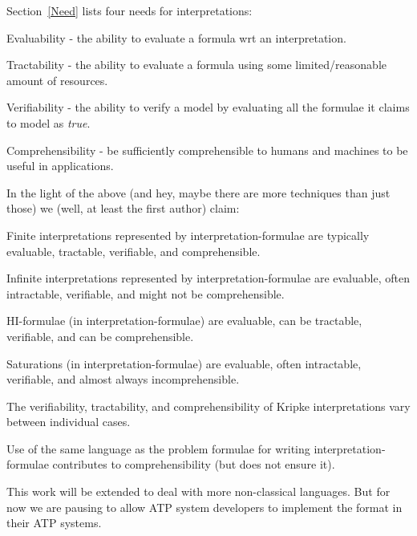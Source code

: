 \documentclass{easychair}
\newenvironment{packed_itemize}{
\vspace*{-0.3em}
\begin{itemize}
\setlength{\partopsep}{0pt}
\setlength{\itemsep}{1pt}
\setlength{\parskip}{0pt}
\setlength{\parsep}{0pt}
}{\end{itemize}}
\newenvironment{packed_enumerate}{
\vspace*{-0.3em}
\begin{enumerate}
\setlength{\partopsep}{0pt}
\setlength{\itemsep}{1pt}
\setlength{\parskip}{0pt}
\setlength{\parsep}{0pt}
}{\end{enumerate}}
\begin{document}
Section~\ref{Need} lists four needs for interpretations: 
\begin{packed_enumerate}
\item Evaluability - the ability to evaluate a formula wrt an interpretation.
\item Tractability - the ability to evaluate a formula using some limited/reasonable amount of
      resources.
\item Verifiability - the ability to verify a model by evaluating all the formulae it claims
      to model as \textit{true}.
\item Comprehensibility - be sufficiently comprehensible to humans and machines to be useful in 
      applications.
\end{packed_enumerate}

In the light of the above (and hey, maybe there are more techniques than just those) we (well,
at least the first author) claim:
\begin{packed_itemize}
\item Finite interpretations represented by interpretation-formulae are typically evaluable,
      tractable, verifiable, and comprehensible.
\item Infinite interpretations represented by interpretation-formulae are evaluable, often 
      intractable, verifiable, and might not be comprehensible.
\item HI-formulae (in interpretation-formulae) are evaluable, can be tractable, verifiable, 
      and can be comprehensible.
\item Saturations (in interpretation-formulae) are evaluable, often intractable, verifiable, 
      and almost always incomprehensible.
\item The verifiability, tractability, and comprehensibility of Kripke interpretations vary
      between individual cases.
\item Use of the same language as the problem formulae for writing interpretation-formulae
      contributes to comprehensibility (but does not ensure it).
\end{packed_itemize}

This work will be extended to deal with more non-classical languages.
But for now we are pausing to allow ATP system developers to implement the format in their 
ATP systems.



\appendix
\end{document}
